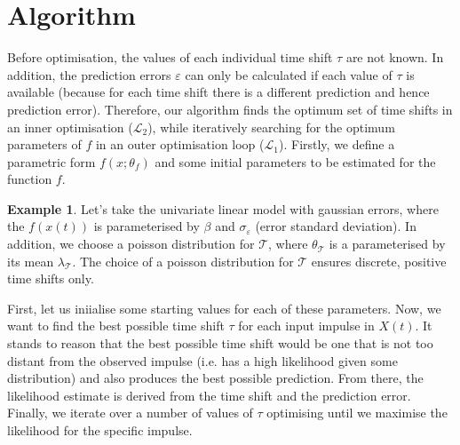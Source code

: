 \documentclass[11pt]{amsart}
\theoremstyle{definition}
\newtheorem{example}{Example}[section]
\begin{document}
\section{Algorithm}

Before optimisation, the values of each individual time shift $\tau$ are not known. In addition, the prediction errors $\varepsilon$ can only be calculated if each value of $\tau$ is available (because for each time shift there is a different prediction and hence prediction error). Therefore, our algorithm finds the optimum set of time shifts in an inner optimisation ($\mathcal{L}_2$), while iteratively searching for the optimum parameters of $f$ in an outer optimisation loop ($\mathcal{L}_1$). 
Firstly, we define a parametric form $f(x;\theta_f)$ and some initial parameters to be estimated for the function $f$. 

\begin{example}\label{example:poisson}
Let's take the univariate linear model with gaussian errors, where the $f(x(t))$ is parameterised by $\beta$ and $\sigma_{\varepsilon}$ (error standard deviation). In addition, we choose a poisson distribution for $\mathcal{T}$, where $\theta_{\mathcal{T}}$ is a parameterised by its mean $\lambda_{\mathcal{T}}$. The choice of a poisson distribution for $\mathcal{T}$
ensures discrete, positive time shifts only.
\end{example}


First, let us iniialise some starting values for each of these parameters. Now, we want to find the best possible time shift $\tau$ for each input impulse in $X(t)$. It stands to reason that the best possible time shift would be one that is not too distant from the observed impulse (i.e. has a high likelihood given some distribution) and also produces the best possible prediction. From there, the likelihood estimate is derived from the time shift and the prediction error.
Finally, we iterate over a number of values of $\tau$ optimising until we maximise the likelihood for the specific impulse.
\end{document}

